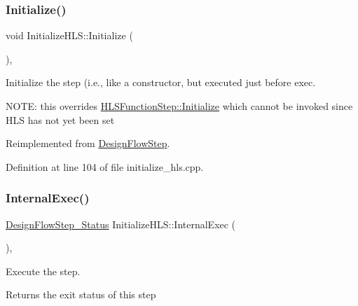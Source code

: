 \mbox{\label{classInitializeHLS_ae1674f8063ae4a38affcf5d2ca3ede18}} 
\subsubsection{\texorpdfstring{Initialize()}{Initialize()}}
{\footnotesize\ttfamily void Initialize\+H\+L\+S\+::\+Initialize (\begin{DoxyParamCaption}{ }\end{DoxyParamCaption})\hspace{0.3cm}{\ttfamily [override]}, {\ttfamily [virtual]}}



Initialize the step (i.\+e., like a constructor, but executed just before exec. 

N\+O\+TE\+: this overrides \hyperlink{classHLSFunctionStep_a966629ba62a8188ff4fa783ab0d4e319}{H\+L\+S\+Function\+Step\+::\+Initialize} which cannot be invoked since H\+LS has not yet been set 

Reimplemented from \hyperlink{classDesignFlowStep_a44b50683382a094976e1d432a7784799}{Design\+Flow\+Step}.



Definition at line 104 of file initialize\+\_\+hls.\+cpp.

\mbox{\label{classInitializeHLS_abb4fa19e0a7910383cb1837ee6e6a1e5}} 
\subsubsection{\texorpdfstring{Internal\+Exec()}{InternalExec()}}
{\footnotesize\ttfamily \hyperlink{design__flow__step_8hpp_afb1f0d73069c26076b8d31dbc8ebecdf}{Design\+Flow\+Step\+\_\+\+Status} Initialize\+H\+L\+S\+::\+Internal\+Exec (\begin{DoxyParamCaption}{ }\end{DoxyParamCaption})\hspace{0.3cm}{\ttfamily [override]}, {\ttfamily [virtual]}}



Execute the step. 

\begin{DoxyReturn}{Returns}
the exit status of this step 
\end{DoxyReturn}



